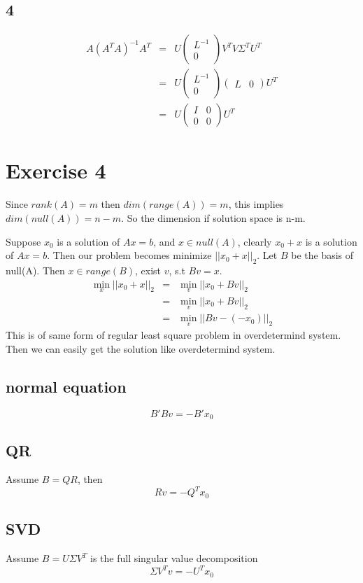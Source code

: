 \documentclass[12pt,a4paper]{article}
\begin{document}
\subsection*{4}
\begin{eqnarray*}
	A(A^TA)^{-1}A^T&=&U\left(\begin{array}{c}
		L^{-1}\\0
	\end{array}\right)V^T V\Sigma^T U^T \\
	&=&U\left(\begin{array}{c}
		L^{-1}\\0
	\end{array}\right)\left(\begin{array}{cc}
	L & 0
\end{array}\right)U^T\\
&=& U\left(\begin{array}{cc}
	I & 0\\
	0 & 0
\end{array}\right)U^T
\end{eqnarray*}
\section*{Exercise 4}
Since $rank(A)=m$ then $dim(range(A))=m$, this implies $dim(null(A))=n-m$. So the dimension if solution space is n-m.

Suppose $x_0$ is a solution of $Ax=b$, and $x\in null(A)$, clearly $x_0+x$ is a solution of $Ax=b$. Then our problem becomes minimize $||x_0+x||_2$. Let $B$ be the basis of null(A). Then $x\in range(B)$, exist $v$, s.t $Bv=x$. 
\begin{eqnarray*}
\min_x||x_0+x||_2&=&\min_v||x_0+Bv||_2\\
&=&\min_v||x_0+Bv||_2\\
&=&\min_v||Bv-(-x_0)||_2
\end{eqnarray*}
This is of same form of regular least square problem in overdetermind system. Then we can easily get the solution like overdetermind system.
\subsection*{normal equation}
\[B'Bv=-B'x_0
\]
\subsection*{QR}
Assume $B=QR$, then
\[Rv=-Q^Tx_0
\]
\subsection*{SVD}
Assume $B=U\Sigma V^T$ is the full singular value decomposition
\[
\Sigma V^Tv=-U^Tx_0
\]
\end{document}
